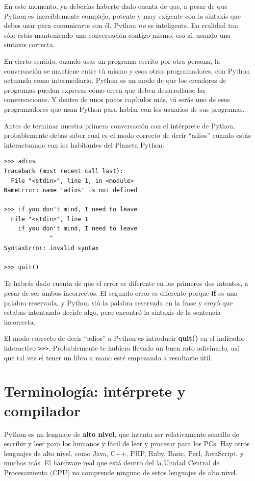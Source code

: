 En este momento, ya deberías haberte dado cuenta de que, a pesar de que Python
es increíblemente complejo, potente y muy exigente con
la sintaxis que debes usar para comunicarte con él, Python {\em no} es
inteligente. En realidad tan sólo estás manteniendo una conversación
contigo mismo, eso sí, usando una sintaxis correcta.

En cierto sentido, cuando usas un programa escrito por otra persona,
la conversación se mantiene entre tú mismo y esos otros programadores,
con Python actuando como intermediario. Python es un
modo de que los creadores de programas puedan expresar cómo creen
que deben desarrollarse las conversaciones. Y dentro
de unos pocos capítulos más, tú serás uno de esos programadores
que usan Python para hablar con los usuarios de sus programas.

Antes de terminar nuestra primera conversación con el intérprete
de Python, probablemente debas saber cual es el modo correcto
de decir ``adios'' cuando estás interactuando con los
habitantes del Planeta Python:

\beforeverb
\begin{verbatim}
>>> adios
Traceback (most recent call last):
  File "<stdin>", line 1, in <module>
NameError: name 'adios' is not defined

>>> if you don't mind, I need to leave
  File "<stdin>", line 1
    if you don't mind, I need to leave
             ^
SyntaxError: invalid syntax

>>> quit()
\end{verbatim}
\afterverb
%
Te habrás dado cuenta de que el error es diferente en los primeros
dos intentos, a pesar de ser ambos incorrectos. El segundo error es diferente porque
{\bf if} es una palabra reservada, y Python vió la palabra
reservada en la frase y creyó que estabas intentando decirle algo, pero encontró
la sintaxis de la sentencia incorrecta.

El modo correcto de decir ``adios'' a Python es introducir
{\bf quit()} en el indicador interactivo {\tt \verb">>>"}.
Probablemente te hubiera llevado un buen rato adivinarlo,
así que tal vez el tener un libro a mano
esté empezando a resultarte útil.

\section{Terminología: intérprete y compilador}

Python es un lenguaje de {\bf alto nivel}, que intenta ser relativamente
sencillo de escribir y leer para los humanos y fácil de leer y procesar para
los PCs. Hay otros lenguajes de alto nivel, como Java, C++,
PHP, Ruby, Basic, Perl, JavaScript, y muchos más. El hardware real que está
dentro del la Unidad Central de Procesamiento (CPU) no comprende
ninguno de estos lenguajes de alto nivel.

